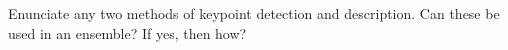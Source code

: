 Enunciate any two methods of keypoint detection and description. Can these be used in an ensemble? If yes, then how?
